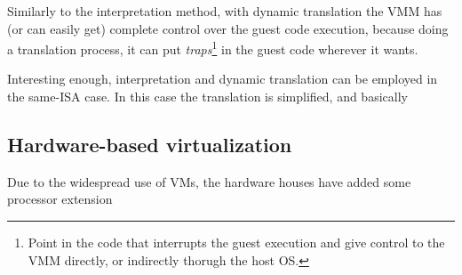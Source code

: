 Similarly to the interpretation method, with dynamic translation the VMM has (or can easily get) complete control over the guest code
execution, because doing a translation process, it can put \emph{traps}\footnote{Point in the code that interrupts the guest
execution and give control to the VMM directly, or indirectly thorugh the host OS.} in the guest code wherever it wants.

Interesting enough, interpretation and dynamic translation can be employed in the same-ISA case. In this case the translation is
simplified, and basically




\subsection{Hardware-based virtualization}
Due to the widespread use of VMs, the hardware houses have added some processor extension


